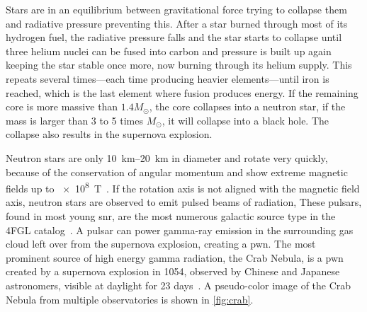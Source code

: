 Stars are in an equilibrium between gravitational force trying to
collapse them and radiative pressure preventing this.
After a star burned through most of its hydrogen fuel,
the radiative pressure falls and the star starts to collapse until three helium nuclei can be fused 
into carbon and pressure is built up again keeping the star stable once more, now
burning through its helium supply.
This repeats several times—each time producing heavier elements—until iron is reached,
which is the last element where fusion produces energy.
If the remaining core is more massive than $\num{1.4} M_\odot$, the core collapses
into a neutron star, if the mass is larger than 3 to 5 times $M_\odot$, it will collapse 
into a black hole.
The collapse also results in the supernova explosion.~\cite{app-angelis}

Neutron stars are only \SIrange{10}{20}{\kilo\meter} in diameter and
rotate very quickly, because of the conservation of angular momentum
and show extreme magnetic fields up to \SI{e8}{\tesla}~\cite{app-angelis}.
If the rotation axis is not aligned with the magnetic field axis,
neutron stars are observed to emit pulsed beams of radiation,
These pulsars, found in most young \gls{snr},
are the most numerous galactic source type in the 4FGL catalog~\cite{4fgl}.
A pulsar can power gamma-ray emission in the surrounding gas cloud left over
from the supernova explosion, creating a \gls{pwn}.
The most prominent source of high energy gamma radiation, the Crab Nebula,
is a \gls{pwn} created by a supernova explosion in 1054, observed by Chinese
and Japanese astronomers, visible at daylight for 23 days~\cite{sn1054}.
A pseudo-color image of the Crab Nebula from multiple observatories is shown in \autoref{fig:crab}.

